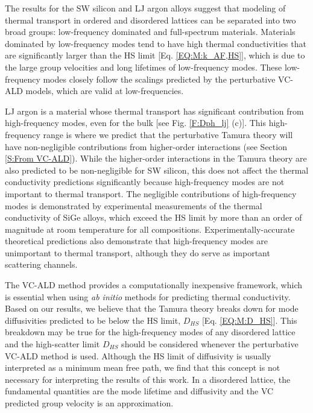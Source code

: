 \documentclass[12pt,twocolumn,iop]{/usr/share/texmf/tex/latex/iop/iopart}[/usr/share/texmf/tex/latex/iop/]
\begin{document}
The results for the SW silicon and LJ argon alloys suggest that 
modeling of thermal transport in ordered and 
disordered lattices can be separated into two broad groups: 
low-frequency dominated and full-spectrum materials.  
Materials dominated by low-frequency modes tend to have high 
thermal conductivities that are significantly larger than the 
HS limit [Eq. \eqref{EQ:M:k_AF,HS}], 
which is due to the large group velocities and long lifetimes 
of low-frequency modes.\cite{abeles_thermal_1962,abeles_lattice_1963,kamitakahara_vibrations_1974,cahill_thermal_2004,cahill_thermal_2005,garg_role_2011,lindsay_thermal_2012,cheaito_experimental_2012} 
These low-frequency modes  
closely follow the scalings predicted by the perturbative VC-ALD 
models, which are valid at low-frequencies. 

LJ argon is a material whose thermal transport has significant 
contribution from high-frequency modes, even for the bulk 
[see Fig. \ref{F:Dph_lj} (c)]. 
This high-frequency range is where we predict that the 
perturbative Tamura theory   
will have non-negligible contributions from higher-order 
interactions (see Section \ref{S:From VC-ALD}). 
While the higher-order interactions in the 
Tamura theory are also predicted to be 
non-negligible for SW silicon, this does not affect the thermal 
conductivity predictions significantly because high-frequency modes  
are not important to thermal transport. The negligible contributions 
of high-frequency modes is demonstrated by experimental measurements 
of the thermal conductivity of SiGe alloys, which exceed the HS limit 
by more than an order of magnitude at room temperature for all 
compositions.
\cite{cahill_lattice_1988,cahill_thermal_2004,cahill_thermal_2005,cheaito_experimental_2012} Experimentally-accurate 
theoretical predictions\cite{garg_role_2011} 
also demonstrate that high-frequency modes 
are unimportant to thermal transport, 
although they do serve as important scattering channels.
\cite{ward_intrinsic_2010} 

The VC-ALD method provides a computationally inexpensive framework, 
which is 
essential when using \emph{ab initio} 
methods for predicting thermal conductivity.
\cite{ward_intrinsic_2010,lindsay_thermal_2012,garg_role_2011,shiga_microscopic_2012,tian_phonon_2012,shiomi_thermal_2011,esfarjani_heat_2011,li_thermal_2012,luckyanova_coherent_2012} Based on our results, 
we believe that the Tamura theory breaks down for mode  
diffusivities predicted to be below the HS limit, $D_{HS}$ 
[Eq. \eqref{EQ:M:D_HS}]. 
This breakdown may be true for the high-frequency modes of any 
disordered lattice\cite{sheng_heat_1991} 
and the high-scatter limit $D_{HS}$ should be 
considered whenever the perturbative VC-ALD method is used.
Although the HS limit of 
diffusivity is usually interpreted as a minimum mean free path,
\cite{kittel_interpretation_1949,graebner_phonon_1986,cahill_lattice_1988,sheng_heat_1991} 
we find that this concept is not necessary for interpreting the results 
of this work. In a disordered lattice, the fundamental quantities are 
the mode lifetime and diffusivity\cite{sheng_heat_1991,allen_thermal_1993,allen_diffusons_1999,taraskin_determination_1999,xu_energy_2009,vitelli_heat_2010,beltukov_ioffe_2013} and the 
VC predicted group velocity is an approximation.
\end{document}
